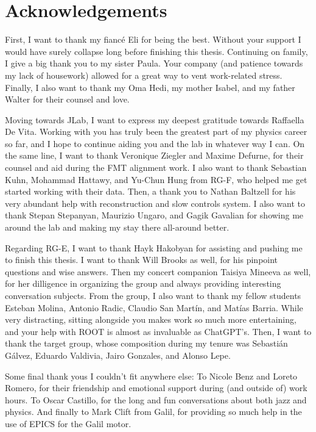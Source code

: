 \section*{Acknowledgements}
    First, I want to thank my fiancé Eli for being the best.
    Without your support I would have surely collapse long before finishing this thesis.
    Continuing on family, I give a big thank you to my sister Paula.
    Your company (and patience towards my lack of housework) allowed for a great way to vent work-related stress.
    Finally, I also want to thank my Oma Hedi, my mother Isabel, and my father Walter for their counsel and love.

    Moving towards JLab, I want to express my deepest gratitude towards Raffaella De Vita.
    Working with you has truly been the greatest part of my physics career so far, and I hope to continue aiding you and the lab in whatever way I can.
    On the same line, I want to thank Veronique Ziegler and Maxime Defurne, for their counsel and aid during the FMT alignment work.
    I also want to thank Sebastian Kuhn, Mohammad Hattawy, and Yu-Chun Hung from RG-F, who helped me get started working with their data.
    Then, a thank you to Nathan Baltzell for his very abundant help with reconstruction and slow controls system.
    I also want to thank Stepan Stepanyan, Maurizio Ungaro, and Gagik Gavalian for showing me around the lab and making my stay there all-around better.

    Regarding RG-E, I want to thank Hayk Hakobyan for assisting and pushing me to finish this thesis.
    I want to thank Will Brooks as well, for his pinpoint questions and wise answers.
    Then my concert companion Taisiya Mineeva as well, for her dilligence in organizing the group and always providing interesting conversation subjects.
    From the group, I also want to thank my fellow students Esteban Molina, Antonio Radic, Claudio San Martín, and Matías Barria.
    While very distracting, sitting alongside you makes work so much more entertaining, and your help with ROOT is almost as invaluable as ChatGPT's.
    Then, I want to thank the target group, whose composition during my tenure was Sebastián Gálvez, Eduardo Valdivia, Jairo Gonzales, and Alonso Lepe.

    Some final thank yous I couldn't fit anywhere else:
    To Nicole Benz and Loreto Romero, for their friendship and emotional support during (and outside of) work hours.
    To Oscar Castillo, for the long and fun conversations about both jazz and physics.
    And finally to Mark Clift from Galil, for providing so much help in the use of EPICS for the Galil motor.
